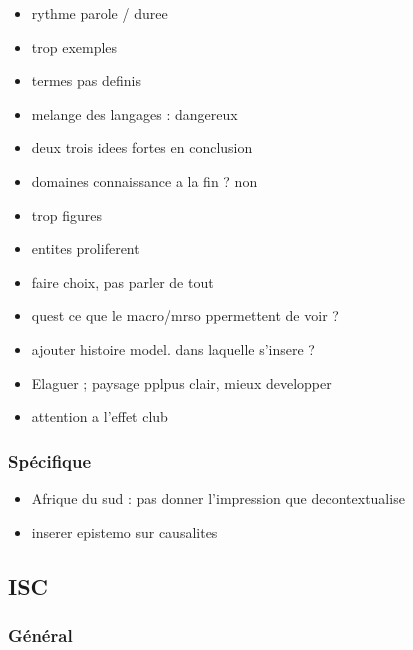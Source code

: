 \documentclass[11pt]{article}
\begin{document}
\begin{itemize}
	\item rythme parole / duree
	\item trop exemples
	\item termes pas definis
	\item melange des langages : dangereux
	\item deux trois idees fortes en conclusion
	\item domaines connaissance a la fin ? non
	\item trop figures
	\item entites proliferent
	\item faire choix, pas parler de tout
	\item quest ce que le macro/mrso ppermettent de voir ?
	\item ajouter histoire model. dans laquelle s'insere ?
	\item Elaguer ; paysage pplpus clair, mieux developper
	\item attention a l'effet club
\end{itemize}

\subsubsection*{Spécifique}


\begin{itemize}
	\item Afrique du sud : pas donner l'impression que decontextualise
	\item inserer epistemo sur causalites
\end{itemize}





\subsection*{ISC}

\subsubsection*{Général}
\end{document}
